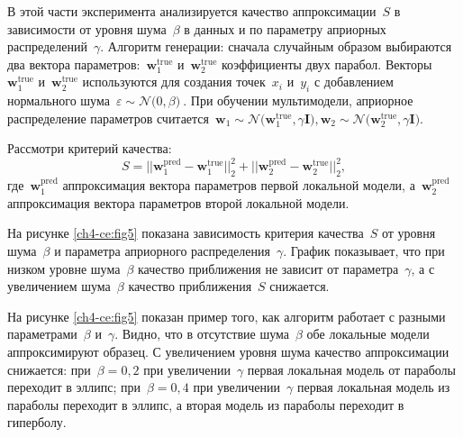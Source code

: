 В этой части эксперимента анализируется качество аппроксимации~$S$ в зависимости от уровня шума~$\beta$ в данных и по параметру априорных распределений~$\gamma$. Алгоритм генерации: сначала случайным образом выбираются два вектора параметров:~$\mathbf{w}^\text{true}_{1}$ и~$\mathbf{w}^\text{true}_{2}$ коэффициенты двух парабол. Векторы~$\mathbf{w}^\text{true}_{1}$ и~$\mathbf{w}^\text{true}_{2}$ используются для создания точек~$x_i$ и~$y_i$ с добавлением нормального шума~$\varepsilon\sim\mathcal{N}\bigr(0, \beta\bigr)~$. При обучении мультимодели, априорное распределение параметров считается~$\mathbf{w}_1\sim\mathcal{N}\bigr(\mathbf{w}^\text{true}_{1}, \gamma\mathbf{I}\bigr), \mathbf{w}_2\sim\mathcal{N}\bigr(\mathbf{w}^\text{true}_{2},\gamma\mathbf{I}\bigr)$.

Рассмотри критерий качества:
\[
S = ||\mathbf{w}^\text{pred}_{1} - \mathbf{w}^\text{true}_{1}||^{2}_{2} + ||\mathbf{w}^\text{pred}_{2} - \mathbf{w}^\text{true}_{2}||^{2}_{2},
\]
где~$\mathbf{w}^\text{pred}_{1}$ аппроксимация вектора параметров первой локальной модели, а~$\mathbf{w}^\text{pred}_{2}~$ аппроксимация вектора параметров второй локальной модели.

На рисунке \ref{ch4-ce:fig5} показана зависимость критерия качества~$S$ от уровня шума~$\beta$ и параметра априорного распределения~$\gamma$. График показывает, что при низком уровне шума~$\beta$ качество приближения не зависит от параметра~$\gamma$, а с увеличением шума~$\beta$ качество приближения~$S$ снижается.

На рисунке \ref{ch4-ce:fig5} показан пример того, как алгоритм работает с разными параметрами~$\beta$ и~$\gamma$. Видно, что в отсутствие шума~$\beta$ обе локальные модели аппроксимируют образец. С увеличением уровня шума качество аппроксимации снижается: при~$\beta = 0{,}2$ при увеличении~$\gamma$ первая локальная модель от параболы переходит в эллипс; при~$\beta = 0{,}4$ при увеличении~$\gamma$ первая локальная модель из параболы переходит в эллипс, а вторая модель из параболы переходит в гиперболу.

